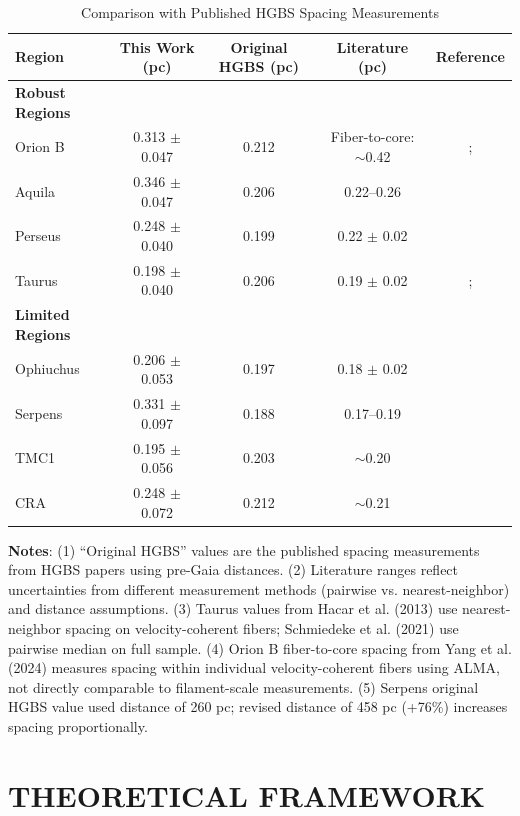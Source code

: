 \documentclass[twoside,twocolumn]{mnras}
\begin{document}
\begin{table}
\caption{Comparison with Published HGBS Spacing Measurements}
\label{tab:literature}
\begin{tabular}{lcccc}
\toprule
Region & This Work (pc) & Original HGBS (pc) & Literature (pc) & Reference \\
\midrule
\textbf{Robust Regions} &  &  &  &  \\
Orion B & 0.313 $\pm$ 0.047 & 0.212 & Fiber-to-core: $\sim$0.42 & \citet{Konyves2020}; \citet{Yang2024} \\
Aquila  & 0.346 $\pm$ 0.047 & 0.206 & 0.22--0.26 & \citet{Konyves2015} \\
Perseus & 0.248 $\pm$ 0.040 & 0.199 & 0.22 $\pm$ 0.02 & \citet{Andre2016} \\
Taurus  & 0.198 $\pm$ 0.040 & 0.206 & 0.19 $\pm$ 0.02 & \citet{Hacar2013}; \citet{Schmiedeke2021} \\
\midrule
\textbf{Limited Regions} &  &  &  &  \\
Ophiuchus & 0.206 $\pm$ 0.053 & 0.197 & 0.18 $\pm$ 0.02 & \citet{Konyves2020} \\
Serpens  & 0.331 $\pm$ 0.097 & 0.188 & 0.17--0.19 & \citet{Konyves2020} \\
TMC1     & 0.195 $\pm$ 0.056 & 0.203 & $\sim$0.20 & \citet{Hacar2013} \\
CRA      & 0.248 $\pm$ 0.072 & 0.212 & $\sim$0.21 & \citet{Konyves2020} \\
\bottomrule
\end{tabular}

\vspace{0.1in}
\footnotesize
\textbf{Notes}: (1) ``Original HGBS'' values are the published spacing measurements from HGBS papers using pre-Gaia distances. (2) Literature ranges reflect uncertainties from different measurement methods (pairwise vs. nearest-neighbor) and distance assumptions. (3) Taurus values from Hacar et al. (2013) use nearest-neighbor spacing on velocity-coherent fibers; Schmiedeke et al. (2021) use pairwise median on full sample. (4) Orion B fiber-to-core spacing from Yang et al. (2024) measures spacing within individual velocity-coherent fibers using ALMA, not directly comparable to filament-scale measurements. (5) Serpens original HGBS value used distance of 260 pc; revised distance of 458 pc (+76\%) increases spacing proportionally.
\end{table}

\section{THEORETICAL FRAMEWORK}
\end{document}

